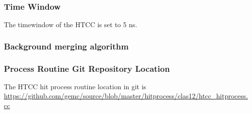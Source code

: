 \subsubsection{Time Window}
The timewindow of the HTCC is set to 5 ns.

\subsubsection{Background merging algorithm}

\subsubsection{Process Routine Git Repository Location}
The HTCC hit process routine location in git is \url{https://github.com/gemc/source/blob/master/hitprocess/clas12/htcc_hitprocess.cc}
